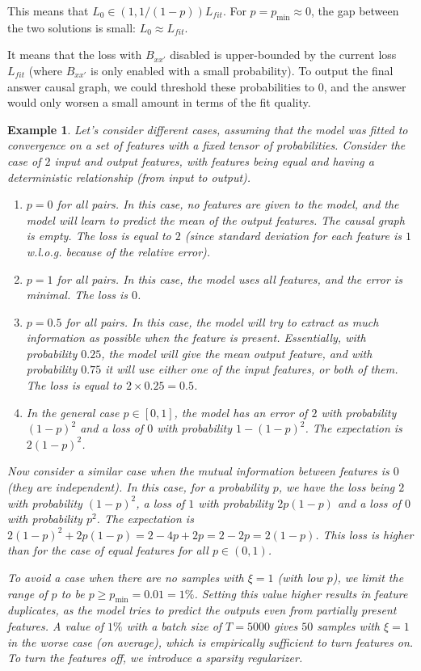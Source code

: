 \documentclass[a4paper,11pt,oneside]{report}
\newtheorem{example}{Example}[section]
\begin{document}
This means that $L_0\in (1, 1/(1-p))L_{fit}$. For $p=p_{\min}\approx 0$, the gap between the two solutions is small: $L_0\approx L_{fit}$.

It means that the loss with $B_{xx'}$ disabled is upper-bounded by the current loss $L_{fit}$ (where $B_{xx'}$ is only enabled with a small probability). To output the final answer causal graph, we could threshold these probabilities to $0$, and the answer would only worsen a small amount in terms of the fit quality.

\begin{example}
    Let's consider different cases, assuming that the model was fitted to convergence on a set of features with a fixed tensor of probabilities. Consider the case of $2$ input and output features, with features being equal and having a deterministic relationship (from input to output).
    \begin{enumerate}
        \item $p=0$ for all pairs. In this case, no features are given to the model, and the model will learn to predict the mean of the output features. The causal graph is empty. The loss is equal to $2$ (since standard deviation for each feature is $1$ w.l.o.g. because of the relative error).
        \item $p=1$ for all pairs. In this case, the model uses all features, and the error is minimal. The loss is $0$.
        \item $p=0.5$ for all pairs. In this case, the model will try to extract as much information as possible when the feature is present. Essentially, with probability $0.25$, the model will give the mean output feature, and with probability $0.75$ it will use either one of the input features, or both of them. The loss is equal to $2\times 0.25=0.5$.
        \item In the general case $p\in [0, 1]$, the model has an error of $2$ with probability $(1-p)^2$ and a loss of $0$ with probability $1-(1-p)^2$. The expectation is $2(1-p)^2$.
    \end{enumerate}

    Now consider a similar case when the mutual information between features is $0$ (they are independent). In this case, for a probability $p$, we have the loss being $2$ with probability $(1-p)^2$, a loss of $1$ with probability $2p(1-p)$ and a loss of $0$ with probability $p^2$. The expectation is $2(1-p)^2+2p(1-p)=2-4p+2p=2-2p=2(1-p)$. This loss is higher than for the case of equal features for all $p\in (0,1)$.

    To avoid a case when there are no samples with $\xi=1$ (with low $p$), we limit the range of $p$ to be $p\geq p_{\min}=0.01=1\%$. Setting this value higher results in feature duplicates, as the model tries to predict the outputs even from partially present features. A value of $1\%$ with a batch size of $T=5000$ gives $50$ samples with $\xi=1$ in the worse case (on average), which is empirically sufficient to turn features on. To turn the features off, we introduce a sparsity regularizer.
\end{example}
\end{document}
